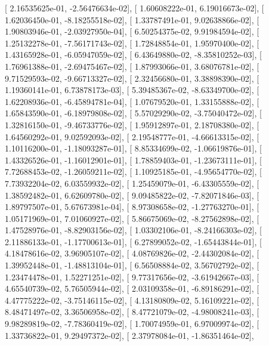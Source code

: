 \documentclass{article}
\begin{document}
       [  2.16535625e-01,  -2.56476634e-02],
       [  1.60608222e-01,   6.19016673e-02],
       [  1.62036450e-01,  -8.18255518e-02],
       [  1.33787491e-01,   9.02638866e-02],
       [  1.90803946e-01,  -2.03927950e-04],
       [  6.50254375e-02,   9.91984594e-02],
       [  1.25132278e-01,  -7.56171743e-02],
       [  1.72848854e-01,   1.95970400e-02],
       [  1.43165928e-01,  -6.05947059e-02],
       [  6.43649880e-02,  -8.35810252e-03],
       [  1.76961388e-01,  -2.69475467e-02],
       [  1.87993066e-01,   3.68076781e-02],
       [  9.71529593e-02,  -9.66713327e-02],
       [  2.32456680e-01,   3.38898390e-02],
       [  1.19360141e-01,   6.73878173e-03],
       [  5.39485367e-02,  -8.63349700e-02],
       [  1.62208936e-01,  -6.45894781e-04],
       [  1.07679520e-01,   1.33155888e-02],
       [  1.65843590e-01,  -6.18979808e-02],
       [  5.57029290e-02,  -3.75040472e-02],
       [  1.32816150e-01,  -9.46733776e-02],
       [  1.95912897e-01,   2.18708380e-02],
       [  1.64560292e-01,   9.02592093e-02],
       [  2.19548777e-01,  -4.66613315e-02],
       [  1.10116200e-01,  -1.18093287e-01],
       [  8.85334699e-02,  -1.06619876e-01],
       [  1.43326526e-01,  -1.16012901e-01],
       [  1.78859403e-01,  -1.23673111e-01],
       [  7.72688453e-02,  -1.26059211e-02],
       [  1.10925185e-01,  -4.95654770e-02],
       [  7.73932204e-02,   6.03559932e-02],
       [  1.25459079e-01,  -6.43305559e-02],
       [  1.38592482e-01,   6.62609780e-02],
       [  9.09485822e-02,  -7.82071846e-03],
       [  1.89797507e-01,   5.67673981e-04],
       [  8.97308658e-02,  -1.27763270e-01],
       [  1.05171969e-01,   7.01060927e-02],
       [  5.86675069e-02,  -8.27562898e-02],
       [  1.47528976e-01,  -8.82903156e-02],
       [  1.03302106e-01,  -8.24166303e-02],
       [  2.11886133e-01,  -1.17700613e-01],
       [  6.27899052e-02,  -1.65443844e-01],
       [  4.18478616e-02,   3.96905107e-02],
       [  4.08769826e-02,  -2.44302084e-02],
       [  1.39952448e-01,  -1.48813104e-01],
       [  6.56508884e-02,   3.56702792e-02],
       [  1.23474478e-01,   1.52271251e-02],
       [  9.77317656e-02,  -3.61942667e-03],
       [  4.65540739e-02,   5.76505944e-02],
       [  2.03109358e-01,  -6.89186291e-02],
       [  4.47775222e-02,  -3.75146115e-02],
       [  4.13180809e-02,   5.16109221e-02],
       [  8.48471497e-02,   3.36506958e-02],
       [  8.47721079e-02,  -4.98008241e-03],
       [  9.98289819e-02,  -7.78360419e-02],
       [  1.70074959e-01,   6.97009974e-02],
       [  1.33736822e-01,   9.29497372e-02],
       [  2.37978084e-01,  -1.86351464e-02],
\end{document}
